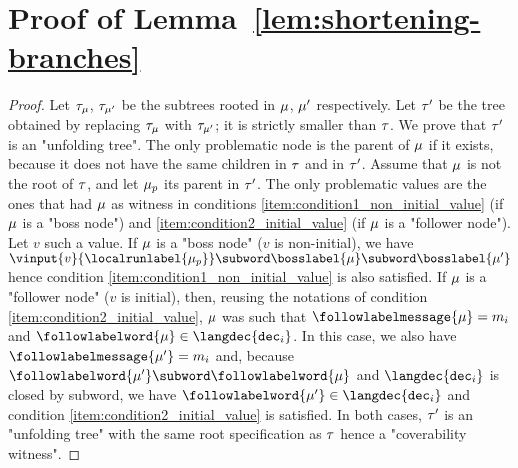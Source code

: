 \section{Proof of Lemma~\ref{lem:shortening-branches}}
\label{app:proofs-reduction-branches}

\lemShorteningBranches*

\begin{proof}
	Let $\tau_{\mu}$, $\tau_{\mu'}$ be the subtrees rooted in $\mu$, $\mu'$ respectively. 
	Let $\tau'$ be the tree obtained by replacing $\tau_{\mu}$ with $\tau_{\mu'}$; it is strictly smaller than $\tau$. We prove that $\tau'$ is an "unfolding tree".
	The only problematic node is the parent of $\mu$ if it exists, because it does not have the same children in $\tau$ and in $\tau'$. Assume that $\mu$ is not the root of $\tau$, and let $\mu_p$ its parent in $\tau'$.
	The only problematic values are the ones that had $\mu$ as witness in conditions \ref{item:condition1_non_initial_value} (if $\mu$ is a "boss node") and \ref{item:condition2_initial_value} (if $\mu$ is a "follower node"). Let $v$ such a value. 
	If $\mu$ is a "boss node" ($v$ is non-initial), we have $\vinput{v}{\localrunlabel{\node_p}} \subword \bosslabel{\node} \subword \bosslabel{\node'}$ hence condition \ref{item:condition1_non_initial_value} is also satisfied. If $\mu$ is a "follower node" ($v$ is initial), then, reusing the notations of condition \ref{item:condition2_initial_value}, $\mu$ was such that $\followlabelmessage{\node} = m_i$ and $\followlabelword{\node} \in \langdec{\decsymb_i}$. In this case, we also have $\followlabelmessage{\node'} = m_i$ and, because $\followlabelword{\node'} \subword \followlabelword{\node}$ and $\langdec{\decsymb_i}$ is closed by subword, we have $\followlabelword{\node'} \in \langdec{\decsymb_i}$ and condition \ref{item:condition2_initial_value} is satisfied. In both cases, $\tau'$ is an "unfolding tree" with the same root specification as $\tau$ hence a "coverability witness".

\end{proof}

